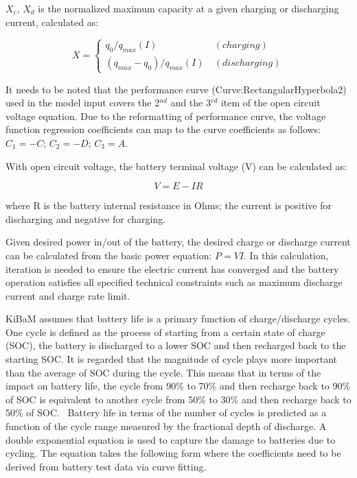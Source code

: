 \({X_c}\), \({X_d}\) is the normalized maximum capacity at a given charging or discharging current, calculated as:

\begin{equation}
X = \left\{
    \begin{array}{cl}
      q_0 / q_{max}(I) & ~ (charging) \\
      (q_{max}-q_0)/q_{max}(I) & ~ (discharging)
    \end{array}
  \right.
\end{equation}

It needs to be noted that the performance curve (Curve:RectangularHyperbola2) used in the model input covers the 2\(^{nd}\) and the 3\(^{rd}\) item of the open circuit voltage equation. Due to the reformatting of performance curve, the voltage function regression coefficients can map to the curve coefficients as follows: \({C_1} = - C\); \({C_2} = - D\); \({C_3} = A\).

With open circuit voltage, the battery terminal voltage (V) can be calculated as:

\begin{equation}
V = E - IR
\end{equation}

where R is the battery internal resistance in Ohms; the current is positive for discharging and negative for charging.

Given desired power in/out of the battery, the desired charge or discharge current can be calculated from the basic power equation: \(P = VI\). In this calculation, iteration is needed to ensure the electric current has converged and the battery operation satisfies all specified technical constraints such as maximum discharge current and charge rate limit.

KiBaM assumes that battery life is a primary function of charge/discharge cycles. One cycle is defined as the process of starting from a certain state of charge (SOC), the battery is discharged to a lower SOC and then recharged back to the starting SOC. It is regarded that the magnitude of cycle plays more important than the average of SOC during the cycle. This means that in terms of the impact on battery life, the cycle from 90\% to 70\% and then recharge back to 90\% of SOC is equivalent to another cycle from 50\% to 30\% and then recharge back to 50\% of SOC.~ Battery life in terms of the number of cycles is predicted as a function of the cycle range measured by the fractional depth of discharge. A double exponential equation is used to capture the damage to batteries due to cycling. The equation takes the following form where the coefficients need to be derived from battery test data via curve fitting.

